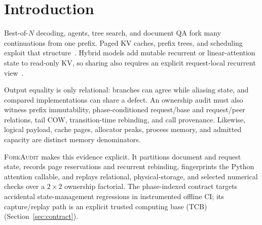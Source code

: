 \documentclass{article}
\newcommand{\method}{\textsc{ForkAudit}}
\begin{document}
\section{Introduction}
\label{sec:intro}

Best-of-$N$ decoding, agents, tree search, and document QA fork many
continuations from one prefix.  Paged KV caches, prefix trees, and scheduling
exploit that structure~\citep{kwon2023pagedattention,zheng2024sglang,
gim2024promptcache,srivatsa2025preble}.  Hybrid models add mutable recurrent or
linear-attention state to read-only KV, so sharing also requires an explicit
request-local recurrent view~\citep{yang2025gateddeltanet,lieber2025jamba,
pan2025marconi}.

Output equality is only relational: branches can agree while aliasing state,
and compared implementations can share a defect.  An ownership audit must also
witness prefix immutability, phase-conditioned request/base and request/peer
relations, tail COW, transition-time rebinding, and call provenance.  Likewise,
logical payload, cache pages, allocator peaks, process memory, and admitted
capacity are distinct memory denominators.

\method{} makes this evidence explicit.  It partitions document and request
state, records page reservations and recurrent rebinding, fingerprints the
Python attention callable, and replays relational, physical-storage, and
selected numerical checks over a $2\times2$ ownership factorial.  The
phase-indexed contract targets accidental state-management regressions in
instrumented offline CI; its capture/replay path is an explicit trusted
computing base (TCB)
(Section~\ref{sec:contract}).
\end{document}
